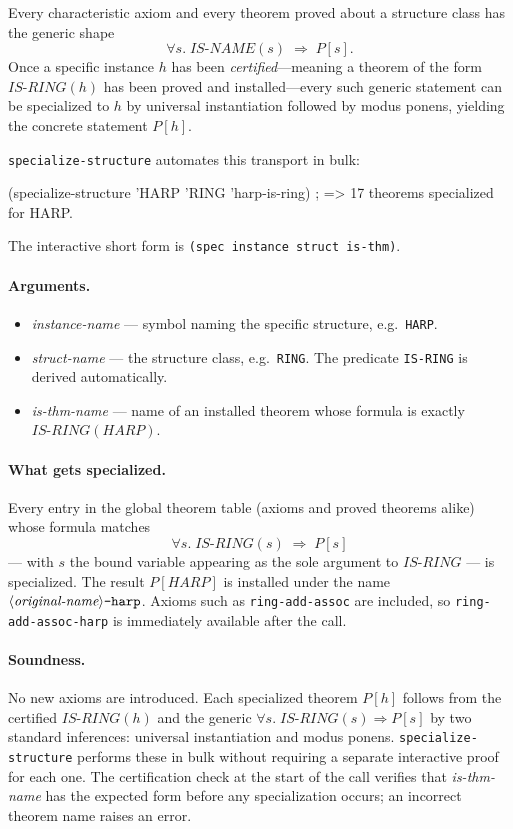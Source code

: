 Every characteristic axiom and every theorem proved about a structure class
has the generic shape
\[
  \forall s.\;\mathit{IS\text{-}NAME}(s) \;\Rightarrow\; P[s].
\]
Once a specific instance $h$ has been \emph{certified}---meaning a theorem
of the form $\mathit{IS\text{-}RING}(h)$ has been proved and installed---every
such generic statement can be specialized to $h$ by universal instantiation
followed by modus ponens, yielding the concrete statement $P[h]$.

\texttt{specialize-structure} automates this transport in bulk:

\begin{VNBcode}
(specialize-structure 'HARP 'RING 'harp-is-ring)
; => 17 theorems specialized for HARP.
\end{VNBcode}

The interactive short form is \texttt{(spec instance struct is-thm)}.

\paragraph{Arguments.}
\begin{itemize}
\item \textit{instance-name} --- symbol naming the specific structure, e.g.\
  \texttt{HARP}.
\item \textit{struct-name} --- the structure class, e.g.\ \texttt{RING}.
  The predicate \texttt{IS-RING} is derived automatically.
\item \textit{is-thm-name} --- name of an installed theorem
  whose formula is exactly $\mathit{IS\text{-}RING}(\mathit{HARP})$.
\end{itemize}

\paragraph{What gets specialized.}
Every entry in the global theorem table (axioms and proved theorems alike)
whose formula matches
\[
  \forall s.\;\mathit{IS\text{-}RING}(s) \;\Rightarrow\; P[s]
\]
--- with $s$ the bound variable appearing as the sole argument to
$\mathit{IS\text{-}RING}$ --- is specialized.  The result $P[\mathit{HARP}]$
is installed under the name
$\langle\textit{original\text{-}name}\rangle\texttt{-harp}$.
Axioms such as \texttt{ring-add-assoc} are included, so
\texttt{ring-add-assoc-harp} is immediately available after the call.

\paragraph{Soundness.}
No new axioms are introduced.  Each specialized theorem $P[h]$ follows
from the certified $\mathit{IS\text{-}RING}(h)$ and the generic
$\forall s.\;\mathit{IS\text{-}RING}(s)\Rightarrow P[s]$ by two standard
inferences: universal instantiation and modus ponens.
\texttt{specialize-structure} performs these in bulk without requiring a
separate interactive proof for each one.  The certification check at the
start of the call verifies that \textit{is-thm-name} has the expected form
before any specialization occurs; an incorrect theorem name raises an error.

